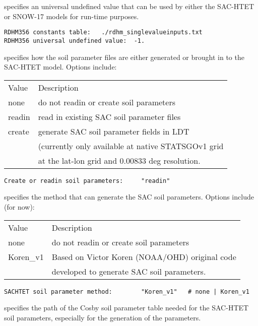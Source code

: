   specifies an universal
  undefined value that can be used by either the SAC-HTET or SNOW-17
  models for run-time purposes.
 
 \begin{Verbatim}[frame=single]
RDHM356 constants table:   ./rdhm_singlevalueinputs.txt
RDHM356 universal undefined value:  -1.
 \end{Verbatim}

 
  specifies how the 
 soil parameter files are either generated or brought in to
 the SAC-HTET model.
 Options include:

 \begin{tabular}{ll}
 Value   & Description                  \\
 none    &  do not readin or create soil parameters \\
 readin  &  read in existing SAC soil parameter files \\
 create  &  generate SAC soil parameter fields in LDT \\
         &  (currently only available at native STATSGOv1 grid\\
         &  at the lat-lon grid and 0.00833 deg resolution.  \\
 \end{tabular}
 
 \begin{Verbatim}[frame=single]
Create or readin soil parameters:     "readin"   
 \end{Verbatim}

 
  specifies the method
  that can generate the SAC soil parameters.
 Options include (for now):

 \begin{tabular}{ll}
 Value     & Description                  \\
 none      &  do not readin or create soil parameters \\
 Koren\_v1 & Based on Victor Koren (NOAA/OHD) original code\\
           &  developed to generate SAC soil parameters.\\
 \end{tabular}
 
 \begin{Verbatim}[frame=single]
SACHTET soil parameter method:        "Koren_v1"   # none | Koren_v1
 \end{Verbatim}

 
  specifies the path 
  of the Cosby soil parameter table needed for the SAC-HTET 
  soil parameters, especially for the generation of the parameters.
 
